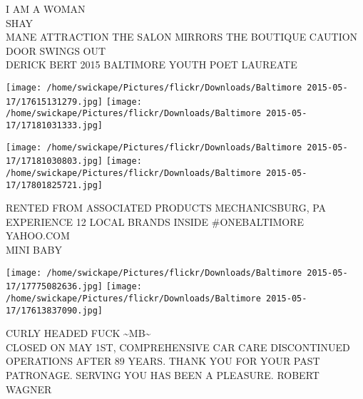 \documentclass[10pt,letterpaper]{article}
\begin{document}
I AM A WOMAN\\
SHAY\\
MANE ATTRACTION THE SALON MIRRORS THE BOUTIQUE CAUTION DOOR SWINGS OUT\\
DERICK BERT 2015 BALTIMORE YOUTH POET LAUREATE\\
\pagebreak

\texttt{[image: /home/swickape/Pictures/flickr/Downloads/Baltimore 2015-05-17/17615131279.jpg]}
\texttt{[image: /home/swickape/Pictures/flickr/Downloads/Baltimore 2015-05-17/17181031333.jpg]}

\texttt{[image: /home/swickape/Pictures/flickr/Downloads/Baltimore 2015-05-17/17181030803.jpg]}
\texttt{[image: /home/swickape/Pictures/flickr/Downloads/Baltimore 2015-05-17/17801825721.jpg]}

RENTED FROM ASSOCIATED PRODUCTS MECHANICSBURG, PA\\
EXPERIENCE 12 LOCAL BRANDS INSIDE \#ONEBALTIMORE\\
YAHOO.COM\\
MINI BABY\\
\pagebreak

\texttt{[image: /home/swickape/Pictures/flickr/Downloads/Baltimore 2015-05-17/17775082636.jpg]}
\texttt{[image: /home/swickape/Pictures/flickr/Downloads/Baltimore 2015-05-17/17613837090.jpg]}

CURLY HEADED FUCK \textasciitilde{}MB\textasciitilde{}\\
CLOSED ON MAY 1ST, COMPREHENSIVE CAR CARE DISCONTINUED OPERATIONS AFTER 89 YEARS.  THANK YOU FOR YOUR PAST PATRONAGE.  SERVING YOU HAS BEEN A PLEASURE.  ROBERT WAGNER\\
\pagebreak
\end{document}
